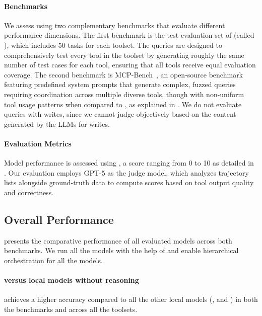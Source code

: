 \paragraph{Benchmarks}
We assess \sys{} using two complementary benchmarks that evaluate different performance dimensions. The first benchmark is the test evaluation set of \sys{} (called \renabench{}), which includes 50 tasks for each toolset. The queries are designed to comprehensively test every tool in the toolset by generating roughly the same number of test cases for each tool, ensuring that all tools receive equal evaluation coverage. The second benchmark is MCP-Bench~\cite{wang2025mcp}, an open-source benchmark featuring predefined system prompts that generate complex, fuzzed queries requiring coordination across multiple diverse tools, though with non-uniform tool usage patterns when compared to \renabench, as explained in . We do not evaluate queries with writes, since we cannot judge objectively based on the content generated by the LLMs for writes. 

\paragraph{Evaluation Metrics}
Model performance is assessed using \judgemetric{}, a score ranging from 0 to 10 as detailed in . 
Our evaluation employs GPT-5 as the judge model, which analyzes trajectory lists alongside ground-truth data to compute \judgemetric{} scores based on tool output quality and correctness.

\subsection{Overall Performance}



 presents the comparative performance of all evaluated models across both benchmarks. We run all the models with the help of \sys{} and enable hierarchical orchestration for all the models. 

\paragraph{\sysmodel{} versus local models without reasoning}
\sysmodel{} achieves a higher accuracy compared to all the other local models (\baselinemodel{}, \xlam{} and \toolace{}) in both the benchmarks and across all the toolsets. 

